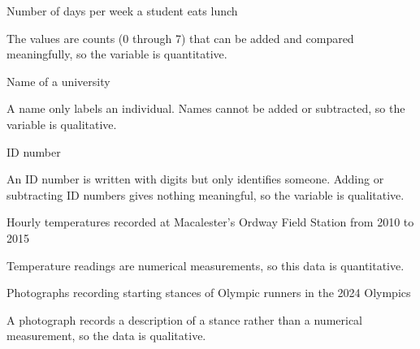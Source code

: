 \documentclass{ximera}
\begin{document}
\begin{problem}
\begin{question}
Number of days per week a student eats lunch
\begin{multipleChoice}
\end{multipleChoice}
\begin{explanation}
The values are counts (0 through 7) that can be added and compared meaningfully, so the variable is quantitative.
\end{explanation}
\end{question}

\begin{question}
Name of a university
\begin{multipleChoice}
\end{multipleChoice}
\begin{explanation}
A name only labels an individual. Names cannot be added or subtracted, so the variable is qualitative.
\end{explanation}
\end{question}

\begin{question}
ID number
\begin{multipleChoice}
\end{multipleChoice}
\begin{explanation}
An ID number is written with digits but only identifies someone. Adding or subtracting ID numbers gives nothing meaningful, so the variable is qualitative.
\end{explanation}
\end{question}

\begin{question}
Hourly temperatures recorded at Macalester's Ordway Field Station from 2010 to 2015
\begin{multipleChoice}
\end{multipleChoice}
\begin{explanation}
Temperature readings are numerical measurements, so this data is quantitative.
\end{explanation}
\end{question}

\begin{question}
Photographs recording starting stances of Olympic runners in the 2024 Olympics
\begin{multipleChoice}
\end{multipleChoice}
\begin{explanation}
A photograph records a description of a stance rather than a numerical measurement, so the data is qualitative.
\end{explanation}
\end{question}


\end{problem}
\end{document}
